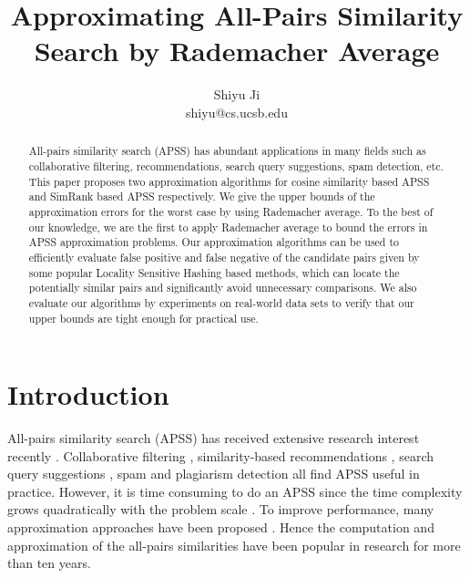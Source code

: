\documentclass{article}
\begin{document}
\title{\Large\bf Approximating All-Pairs Similarity Search by Rademacher Average}
\author{Shiyu Ji\\ shiyu@cs.ucsb.edu}
\date{}
\maketitle

\newtheorem{definition}{Definition}
\theoremstyle{definition}
\newtheorem{theorem}{Theorem}
\theoremstyle{plain}
\newtheorem{lemma}{Lemma}
\theoremstyle{plain}
\newtheorem{corollary}{Corollary}
\theoremstyle{plain}

\begin{abstract}
All-pairs similarity search (APSS) has abundant applications in many fields such as collaborative filtering, recommendations, search query suggestions, spam detection, etc.
This paper proposes two approximation algorithms for cosine similarity based APSS and SimRank based APSS respectively. 
We give the upper bounds of the approximation errors for the worst case by using Rademacher average.
To the best of our knowledge, we are the first to apply Rademacher average to bound the errors in APSS approximation problems.
{\color{black} Our approximation algorithms can be used to efficiently evaluate false positive and false negative of the candidate pairs given by some popular Locality Sensitive Hashing based methods, which can locate the potentially similar pairs and significantly avoid unnecessary comparisons.}
We also evaluate our algorithms by experiments on real-world data sets to verify that our upper bounds are tight enough for practical use.
\end{abstract}

\section{Introduction}
All-pairs similarity search (APSS) has received extensive research interest recently \cite{BMS07,Xia16,ATY13,TAJY14}. Collaborative filtering \cite{SKK01}, similarity-based recommendations \cite{RV97}, search query suggestions \cite{CJP08}, spam and plagiarism detection \cite{CDG07,LCH06} all find APSS useful in practice. However, it is time consuming to do an APSS since the time complexity grows quadratically with the problem scale \cite{BMS07,ATY13,TAJY14}. To improve performance, many approximation approaches have been proposed \cite{GIM99,FKS03,IM98,Char02,LRU14}. Hence the computation \cite{BMS07,DHM04,Xia16,ATY13,TAJY14} and approximation \cite{LRU14,GIM99,FKS03,IM98,Char02} of the all-pairs similarities have been popular in research for more than ten years.
\end{document}
